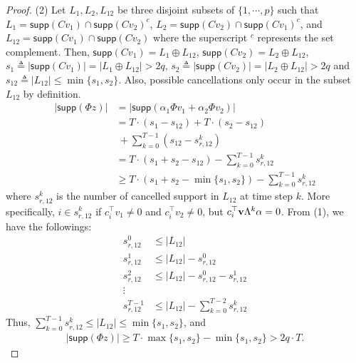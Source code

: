 \documentclass[journal]{IEEEtran}
\begin{document}
\begin{proof}
(2) Let $L_1, L_2, L_{12}$ be three disjoint subsets of $\{1,\cdots, p\}$ such that $L_1 = \textsf{supp} (C v_1) \cap \textsf{supp}(C v_2)^c $, $L_2 = \textsf{supp} (Cv_2) \cap \textsf{supp} (C v_1)^c $, and $L_{12} = \textsf{supp} (C v_1) \cap \textsf{supp} (C v_2)$ where the superscript $^c$ represents the set complement. Then, $\textsf{supp} (C v_1)  = L_1 \oplus L_{12}$, $\textsf{supp} (C v_2)  = L_2 \oplus L_{12}$, $ s_1 \triangleq \lvert \textsf{supp} (C v_1) \rvert = \lvert  L_1 \oplus L_{12} \rvert > 2q$,  $s_2 \triangleq \lvert \textsf{supp} ( C v_2) \rvert =  \lvert L_2 \oplus L_{12} \rvert > 2q $ and $s_{12} \triangleq \lvert  L_{12} \rvert \le \min \{s_1, s_2\}$. 
Also, possible cancellations only occur in the subset $L_{12}$ by definition. 
\begin{equation}
\begin{aligned}
	\lvert \textsf{supp} (\Phi z) \rvert &= \lvert \textsf{supp} (\alpha_1 \Phi v_1 + \alpha_2 \Phi v_2) \vert  \\&= T \cdot (s_1 - s_{12}) + T\cdot (s_2 - s_{12}) \\ &~+ \sum_{k=0}^{T-1} (s_{12}- s_{r,12}^k) \\
	&=T \cdot (s_1 + s_2 - s_{12}) - \sum_{k=0}^{T-1} s_{r,12}^k \\&
	\ge T  \cdot(s_1 + s_2 - \min \{ s_1, s_2 \}) - \sum_{k=0}^{T-1} s_{r,12}^k \nonumber
\end{aligned}
\end{equation}
where $s_{r,12}^k$ is the number of cancelled support in $L_{12}$ at time step $k$. 
More specifically, $i \in s_{r,12}^k$ if $c_i^\top v_1 \neq 0$ and $c_i^\top v_2 \neq 0$, but $c_i^\top{\bf v}\Lambda^k \alpha = 0$.
From (1), we have the followings:
\begin{equation}
\begin{aligned}
	s_{r,12}^0 &\le \lvert L_{12} \rvert \\
	s_{r,12}^1 &\le \lvert L_{12} \rvert - s_{r,12}^0 \\
	s_{r,12}^2 &\le \lvert L_{12} \rvert - s_{r,12}^0 - s_{r,12}^1 \\
	\vdots & \\
	s_{r,12}^{T-1} & \le \lvert L_{12} \rvert - \sum_{k=0}^{T-2} s_{r,12}^k \nonumber 
\end{aligned}
\end{equation}
Thus, $\sum_{k=0}^{T-1}  s_{r,12}^k \le \lvert L_{12} \vert \le \min \{s_1, s_2 \} $, and
\begin{equation}
\begin{aligned}
	\lvert \textsf{supp} (\Phi z) \vert \ge T \cdot \max\{ s_1, s_2 \} - \min \{ s_1, s_2 \}  > 2q \cdot T .\nonumber 
\end{aligned}
\end{equation}
\end{proof}
\end{document}
